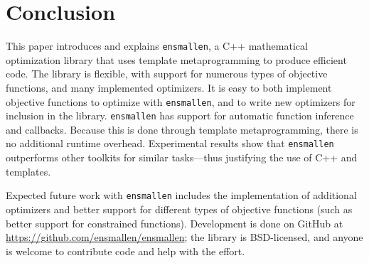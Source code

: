 \section{Conclusion}
\label{sec:conclusion}

This paper introduces and explains {\tt ensmallen}, a C++ mathematical
optimization library that uses template metaprogramming to produce efficient
code.  The library is flexible, with support for numerous types of objective
functions, and many implemented optimizers.  It is easy to both implement
objective functions to optimize with {\tt ensmallen}, and to write new
optimizers for inclusion in the library.  {\tt ensmallen} has support for
automatic function inference and callbacks.  Because this is done through
template metaprogramming, there is no additional runtime overhead.  Experimental
results show that {\tt ensmallen} outperforms other toolkits for similar
tasks---thus justifying the use of C++ and templates.

Expected future work with {\tt ensmallen} includes the implementation of
additional optimizers and better support for different types of objective
functions (such as better support for constrained functions).  Development is
done on GitHub at \url{https://github.com/ensmallen/ensmallen}; the library is
BSD-licensed, and anyone is welcome to contribute code and help with the effort.
